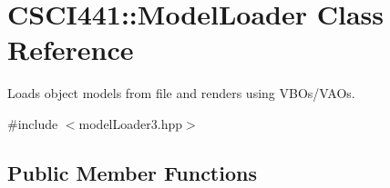 \hypertarget{class_c_s_c_i441_1_1_model_loader}{}\section{C\+S\+C\+I441\+:\+:Model\+Loader Class Reference}
\label{class_c_s_c_i441_1_1_model_loader}


Loads object models from file and renders using V\+B\+Os/\+V\+A\+Os.  




{\ttfamily \#include $<$model\+Loader3.\+hpp$>$}

\subsection*{Public Member Functions}
